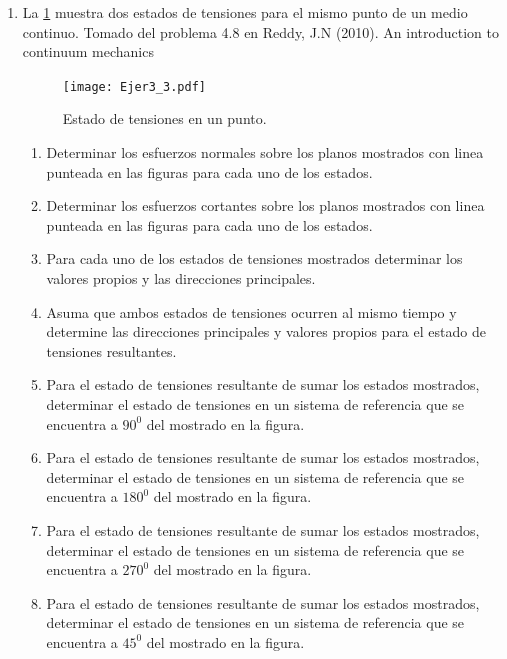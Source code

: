 \documentclass[../notas medios.tex]{subfiles}
\begin{document}
\begin{enumerate}
\item \label{punto03} La  \cref{planos} muestra dos estados de tensiones
para el mismo punto de un medio continuo. {Tomado del problema 4.8 en Reddy, J.N (2010). An introduction to continuum mechanics}
%
\begin{figure}[H]
	\centering
	\texttt{[image: Ejer3\_3.pdf]}
	\caption{Estado de tensiones en un punto.}
	\label{planos}
\end{figure}
\begin{enumerate}
	\item Determinar los esfuerzos normales sobre los planos mostrados con linea punteada en las figuras para cada uno de los estados.
	\item Determinar los esfuerzos cortantes sobre los planos mostrados con linea punteada en las figuras para cada uno de los estados.
	\item Para cada uno de los estados de tensiones mostrados determinar los valores propios y las direcciones principales.
	\item Asuma que ambos estados de tensiones ocurren al mismo tiempo y determine las direcciones principales y valores propios para el estado de tensiones resultantes.
	\item Para el estado de tensiones resultante de sumar los estados mostrados, determinar el estado de tensiones en un sistema de referencia que se encuentra a $90^0$ del mostrado en la figura.
	\item Para el estado de tensiones resultante de sumar los estados mostrados, determinar el estado de tensiones en un sistema de referencia que se encuentra a $180^0$ del mostrado en la figura.
	\item Para el estado de tensiones resultante de sumar los estados mostrados, determinar el estado de tensiones en un sistema de referencia que se encuentra a $270^0$ del mostrado en la figura.
	\item Para el estado de tensiones resultante de sumar los estados mostrados, determinar el estado de tensiones en un sistema de referencia que se encuentra a $45^0$ del mostrado en la figura.
\end{enumerate}


\end{enumerate}
\end{document}
